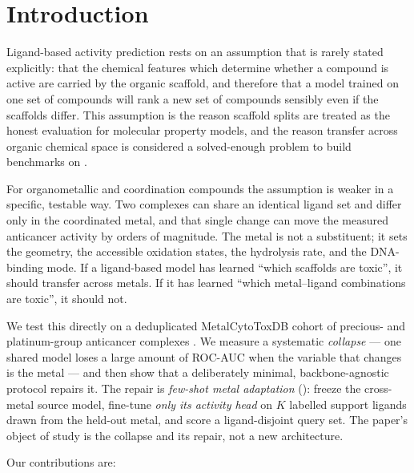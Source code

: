 \section{Introduction}
\label{sec:intro}

Ligand-based activity prediction rests on an assumption that is rarely stated
explicitly: that the chemical features which determine whether a compound is
active are carried by the organic scaffold, and therefore that a model trained
on one set of compounds will rank a new set of compounds sensibly even if the
scaffolds differ. This assumption is the reason scaffold splits
\citep{bemis1996murcko} are treated as the honest evaluation for molecular
property models, and the reason transfer across organic chemical space is
considered a solved-enough problem to build benchmarks on
\citep{moleculenet2018}.

For organometallic and coordination compounds the assumption is weaker in a
specific, testable way. Two complexes can share an identical ligand set and
differ only in the coordinated metal, and that single change can move the
measured anticancer activity by orders of magnitude. The metal is not a
substituent; it sets the geometry, the accessible oxidation states, the
hydrolysis rate, and the DNA-binding mode. If a ligand-based model has learned
``which scaffolds are toxic'', it should transfer across metals. If it has
learned ``which metal--ligand combinations are toxic'', it should not.

We test this directly on a deduplicated MetalCytoToxDB cohort of precious- and
platinum-group anticancer complexes \citep{krasnov2026metalcytotoxdb}. We
measure a systematic \emph{collapse} --- one shared model loses a large amount
of ROC-AUC when the variable that changes is the metal --- and then show that a
deliberately minimal, backbone-agnostic protocol repairs it. The repair is
\emph{few-shot metal adaptation} (\fsma): freeze the cross-metal source model,
fine-tune \emph{only its activity head} on $K$ labelled support ligands drawn
from the held-out metal, and score a ligand-disjoint query set. The paper's
object of study is the collapse and its repair, not a new architecture.

Our contributions are:

